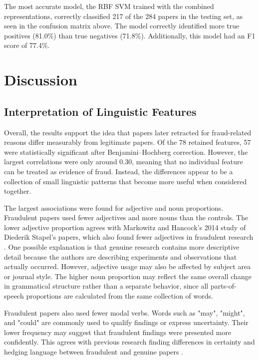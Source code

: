 \documentclass[11pt,letterpaper]{article}
\begin{document}
The most accurate model, the RBF SVM trained with the combined representations, correctly classified 217 of the 284 papers in the testing set, as seen in the confusion matrix above. The model correctly identified more true positives (81.0\%) than true negatives (71.8\%). Additionally, this model had an F1 score of 77.4\%.

\section{Discussion}

\subsection{Interpretation of Linguistic Features}

Overall, the results support the idea that papers later retracted for fraud-related reasons differ measurably from legitimate papers. Of the 78 retained features, 57 were statistically significant after Benjamini--Hochberg correction. However, the largest correlations were only around 0.30, meaning that no individual feature can be treated as evidence of fraud. Instead, the differences appear to be a collection of small linguistic patterns that become more useful when considered together.

The largest associations were found for adjective and noun proportions. Fraudulent papers used fewer adjectives and more nouns than the controls. The lower adjective proportion agrees with Markowitz and Hancock's 2014 study of Diederik Stapel's papers, which also found fewer adjectives in fraudulent research \cite{markowitz2014}. One possible explanation is that genuine research contains more descriptive detail because the authors are describing experiments and observations that actually occurred. However, adjective usage may also be affected by subject area or journal style. The higher noun proportion may reflect the same overall change in grammatical structure rather than a separate behavior, since all parts-of-speech proportions are calculated from the same collection of words.

Fraudulent papers also used fewer modal verbs. Words such as "may", "might", and "could" are commonly used to qualify findings or express uncertainty. Their lower frequency may suggest that fraudulent findings were presented more confidently. This agrees with previous research finding differences in certainty and hedging language between fraudulent and genuine papers \cite{markowitz2014}.
\end{document}
